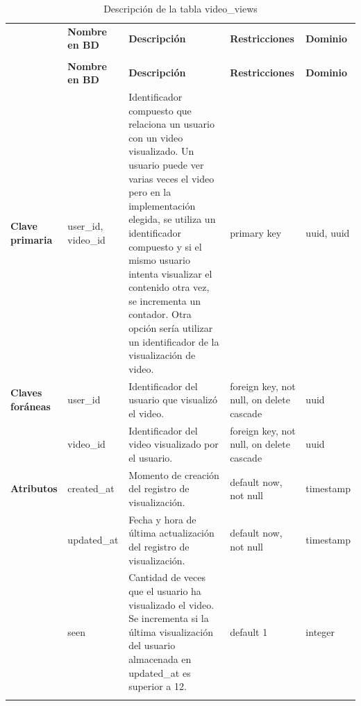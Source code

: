 
\renewcommand{\arraystretch}{1.35}
\setlength{\tabcolsep}{3pt}
\small

\begin{longtable}{|
>{\raggedright\arraybackslash}p{1.9cm}|
>{\raggedright\arraybackslash}p{2.7cm}|
>{\raggedright\arraybackslash}p{4.9cm}|
>{\raggedright\arraybackslash}p{2.7cm}|
>{\raggedright\arraybackslash}p{2.1cm}|
}
\hline

\rowcolor[gray]{0.75}
\multicolumn{5}{|c|}{\textbf{Visualizaciones de videos}} \\
\hline

 & \textbf{Nombre en BD} & \textbf{Descripción} & \textbf{Restricciones} & \textbf{Dominio} \\
\hline
\endfirsthead

\hline
\rowcolor[gray]{0.75}
\multicolumn{5}{|c|}{\textbf{Visualizaciones de videos}} \\
\hline

 & \textbf{Nombre en BD} & \textbf{Descripción} & \textbf{Restricciones} & \textbf{Dominio} \\
\hline
\endhead

\textbf{Clave primaria}
& user\_\allowbreak id, video\_\allowbreak id
& Identificador compuesto que relaciona un usuario con un video visualizado. Un usuario puede ver varias veces el video pero en la implementación elegida, se utiliza un identificador compuesto y si el mismo usuario intenta visualizar el contenido otra vez, se incrementa un contador. Otra opción sería utilizar un identificador de la visualización de video. 
& primary key
& uuid, uuid \\
\hline

\textbf{Claves foráneas}
& user\_\allowbreak id
& Identificador del usuario que visualizó el video.
& foreign key, not null, on delete cascade
& uuid \\
\cline{2-5}

& video\_\allowbreak id
& Identificador del video visualizado por el usuario.
& foreign key, not null, on delete cascade
& uuid \\
\hline

\textbf{Atributos}
& created\_\allowbreak at
& Momento de creación del registro de visualización.
& default now, not null
& timestamp \\
\cline{2-5}

& updated\_\allowbreak at
& Fecha y hora de última actualización del registro de visualización.
& default now, not null
& timestamp \\
\cline{2-5}

& seen
& Cantidad de veces que el usuario ha visualizado el video. Se incrementa si la última visualización del usuario almacenada en updated\_at es superior a 12.
& default 1
& integer \\
\hline

\caption{Descripción de la tabla video\_views}
\end{longtable}


